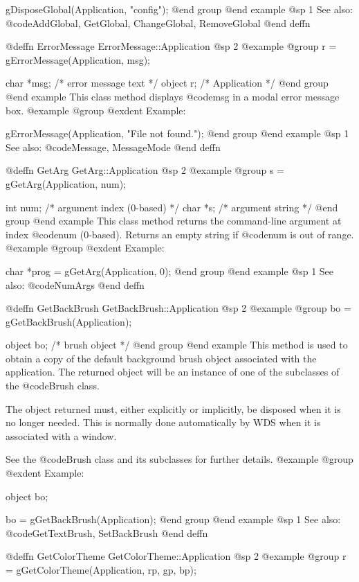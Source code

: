 gDisposeGlobal(Application, "config");
@end group
@end example
@sp 1
See also:  @code{AddGlobal, GetGlobal, ChangeGlobal, RemoveGlobal}
@end deffn



@deffn {ErrorMessage} ErrorMessage::Application
@sp 2
@example
@group
r = gErrorMessage(Application, msg);

char    *msg;   /*  error message text  */
object  r;      /*  Application         */
@end group
@end example
This class method displays @code{msg} in a modal error message box.
@example
@group
@exdent Example:

gErrorMessage(Application, "File not found.");
@end group
@end example
@sp 1
See also:  @code{Message, MessageMode}
@end deffn



@deffn {GetArg} GetArg::Application
@sp 2
@example
@group
s = gGetArg(Application, num);

int     num;    /*  argument index (0-based)  */
char    *s;     /*  argument string           */
@end group
@end example
This class method returns the command-line argument at index
@code{num} (0-based).  Returns an empty string if @code{num} is out
of range.
@example
@group
@exdent Example:

char *prog = gGetArg(Application, 0);
@end group
@end example
@sp 1
See also:  @code{NumArgs}
@end deffn



@deffn {GetBackBrush} GetBackBrush::Application
@sp 2
@example
@group
bo = gGetBackBrush(Application);

object  bo;     /*  brush object  */
@end group
@end example
This method is used to obtain a copy of the default background brush
object associated with the application.  The returned object will be an
instance of one of the subclasses of the @code{Brush} class.

The object returned must, either explicitly or implicitly, be
disposed when it is no longer needed.  This is normally done
automatically by WDS when it is associated with a window.

See the @code{Brush} class and its subclasses for further details.
@example
@group
@exdent Example:

object  bo;

bo = gGetBackBrush(Application);
@end group
@end example
@sp 1
See also:  @code{GetTextBrush, SetBackBrush}
@end deffn



@deffn {GetColorTheme} GetColorTheme::Application
@sp 2
@example
@group
r = gGetColorTheme(Application, rp, gp, bp);

